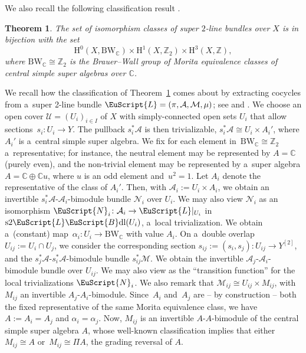 \documentclass[10pt,a4paper]{amsart}
\numberwithin{equation}{section}
\newtheorem{Theorem}{Theorem}[section]
\def\mathscr#1{\EuScript{#1}}
\def\Z {\mathbb{Z}}
\def\C {\mathbb{C}}
\def\h {\mathrm{H}}
\newcommand{\LineBdl}{\mathscr{L}\mathscr{B}\mathrm{dl}}
\newcommand{\stwoLineBdl}{\mathrm{s}2\LineBdl}
\begin{document}
We also recall the following classification result \cite[Theorem~4.4.4]{Kristel2020}.

\begin{Theorem}
\label{super-2-line-bundles}
The set of isomorphism classes of super $2$-line bundles over $X$ is in bijection with the set
\begin{equation*}
\h^0(X,\mathrm{BW}_\C) \times \h^1(X,\Z_2) \times \h^3(X,\Z),
\end{equation*}
where $\mathrm{BW}_\C\cong \Z_2$ is the Brauer--Wall group of Morita equivalence classes of central simple super algebras over $\C$.
\end{Theorem}

\begin{Remark}
\label{extracting-cocycle}
We recall how the classification of Theorem~\ref{super-2-line-bundles} comes about by extracting cocycles from a~super 2-line bundle $\mathscr{L}=(\pi,\mathcal{A},\mathcal{M},\mu)$; see \cite[Section~4]{Kristel2020} and \cite[Section~2.2]{Mertsch2020}. We choose an open cover $\mathcal{U}=(U_i)_{i\in I}$ of $X$ with simply-connected open sets $U_i$ that allow sections~${s_i\colon U_i \to Y}$.
The pullback $s_i^{*}\mathcal{A}$ is then trivializable, $s_i^{*}\mathcal{A} \cong U_i \times A_i'$, where $A_i'$ is a~central simple super algebra. We fix for each element in~$\mathrm{BW}_{\C}\cong \Z_2$ a~representative; for instance, the neutral element may be represented by $A=\C$ (purely even), and the non-trivial element may be represented by a~super algebra $A=\C \oplus \C u$, where $u$ is an odd element and~${u^2=1}$.
 Let $A_i$ denote the representative of the class of $A_i'$. Then, with $\mathcal{A}_i:=U_i \times A_i$, we obtain an invertible $s_i^{*}\mathcal{A}$-$\mathcal{A}_i$-bimodule bundle $\mathcal{N}_i$ over $U_i$. We may also view $\mathcal{N}_i$ as an isomorphism $\mathscr{N}_i\colon \mathcal{A}_i \to \mathscr{L}|_{U_i}$ in~$\stwoLineBdl(U_i)$, a~local trivialization. We obtain a~(constant) map~${\alpha_i\colon U_i \to \mathrm{BW}_{\C}}$ with value $A_i$.
On a~double overlap $U_{ij} :=U_i \cap U_j$, we consider the corresponding section $s_{ij} := (s_i,s_j)\colon U_{ij} \to Y^{[2]}$, and the $s_j^{*}\mathcal{A}$-$s_i^{*}\mathcal{A}$-bimodule bundle $s_{ij}^{*}\mathcal{M}$.
 We obtain the invertible $\mathcal{A}_j$-$\mathcal{A}_i$-bimodule bundle  over $U_{ij}$.
 We may also view \smash{$\mathcal{M}_{ij} = \mathscr{N}_j^{-1} \circ \mathscr{N}_i\colon \mathcal{A}_i \to \mathcal{A}_j$} as the ``transition function'' for the local trivializations $\mathscr{N}_i$. We also remark that $\mathcal{M}_{ij} \cong U_{ij}\times M_{ij}$, with $M_{ij}$ an invertible $A_j$-$A_i$-bimodule. Since~$A_i$ and~$A_j$ are -- by construction -- both the fixed representative of the same Morita equivalence class, we have $A:=A_i=A_j$ and $\alpha_i = \alpha_j$. Now, $M_{ij}$ is an invertible $A$-$A$-bimodule of the central simple super algebra $A$, whose well-known classification implies that either $M_{ij}\cong A$ or~${M_{ij} \cong \Pi A}$, the grading reversal of $A$.

\end{Remark}
\end{document}
